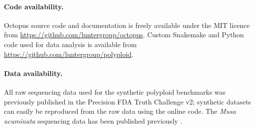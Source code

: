 \documentclass[notitlepage, twocolumn, 10pt]{article}
\begin{document}
\paragraph*{Code availability.} Octopus source code and documentation is freely available under the MIT licence from \url{https://github.com/luntergroup/octopus}. Custom Snakemake and Python code used for data analysis is available from \url{https://github.com/luntergroup/polyploid}.

\paragraph*{Data availability.} All raw sequencing data used for the synthetic polyploid benchmarks was previously published in the Precision FDA Truth Challenge v2\cite{RN809}; synthetic datasets can easily be reproduced from the raw data using the online code. The \textit{Musa acuminata} sequencing data has been published previously \cite{RN670}.
\end{document}
